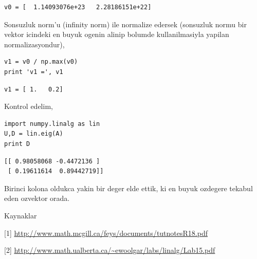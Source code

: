 \documentclass[12pt,fleqn]{article}\usepackage{../common}
\begin{document}
\begin{verbatim}
v0 = [  1.14093076e+23   2.28186151e+22]
\end{verbatim}

Sonsuzluk norm'u (infinity norm) ile normalize edersek (sonsuzluk normu bir
vektor icindeki en buyuk ogenin alinip bolumde kullanilmasiyla yapilan
normalizasyondur), 

\begin{verbatim}
v1 = v0 / np.max(v0)
print 'v1 =', v1
\end{verbatim}

\begin{verbatim}
v1 = [ 1.   0.2]
\end{verbatim}

Kontrol edelim,

\begin{verbatim}
import numpy.linalg as lin
U,D = lin.eig(A)
print D
\end{verbatim}

\begin{verbatim}
[[ 0.98058068 -0.4472136 ]
 [ 0.19611614  0.89442719]]
\end{verbatim}

Birinci kolona oldukca yakin bir deger elde ettik, ki en buyuk ozdegere
tekabul eden ozvektor orada.

Kaynaklar

[1] \url{http://www.math.mcgill.ca/feys/documents/tutnotesR18.pdf}

[2] \url{http://www.math.ualberta.ca/~ewoolgar/labs/linalg/Lab15.pdf}
\end{document}
